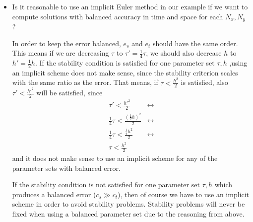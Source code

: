 \documentclass[12pt,a4paper]{scrreprt}
\begin{document}
\begin{itemize}
\item Is it reasonable to use an implicit Euler method in our example if we want to compute solutions with balanced accuracy in time and space for each $N_x , N_y$ ?\newline
{\footnotesize
In order to keep the error balanced, $e_s$ and $e_t$ should have the same order. This means if we are decreasing $\tau$ to $\tau'=\frac{1}{4}\tau$, we should also decrease $h$ to $h'=\frac{1}{2}h$.
If the stability condition is satisfied for one parameter set $\tau,h$ ,using an implicit scheme does not make sense, since the stability criterion scales with the same ratio as the error. That means, if $\tau<\frac{h^2}{2}$ is satisfied, also $\tau'<\frac{h'^2}{2}$ will be satisfied, since 
\begin{align*}
\tau'<\frac{h'^2}{2} 									&\leftrightarrow\\
\frac{1}{4}\tau<\frac{\left(\frac{1}{2}h\right)^2}{2}	&\leftrightarrow\\ \frac{1}{4}\tau<\frac{\frac{1}{4}h^2}{2} 				&\leftrightarrow\\ \tau<\frac{h^2}{2}&
\end{align*}
and it does not make sense to use an implicit scheme for any of the parameter sets with balanced error.

If the stability condition is not satisfied for one parameter set $\tau,h$ which produces a balanced error ($c_s \gg c_t$), then of course we have to use an implicit scheme in order to avoid stability problems. Stability problems will never be fixed when using a balanced parameter set due to the reasoning from above.
}


\end{itemize}
\end{document}
